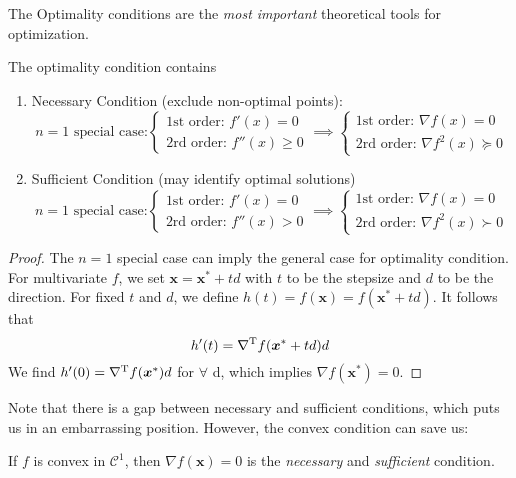 The Optimality conditions are the \emph{most important} theoretical tools for optimization.
\begin{theorem}The optimality condition contains
\begin{enumerate}
\item
Necessary Condition (exclude non-optimal points):
\[
\mbox{$n=1$ special case:}\left\{
\begin{aligned}
\mbox{1st order: }f'(x)=0\\
\mbox{2rd order: }f''(x)\ge0
\end{aligned}
\right.\implies
\left\{
\begin{aligned}
\mbox{1st order: }\nabla f(x)=0\\
\mbox{2rd order: }\nabla f^2(x)\succeq0
\end{aligned}
\right.
\]
\item
Sufficient Condition (may identify optimal solutions)
\[
\mbox{$n=1$ special case:}\left\{
\begin{aligned}
\mbox{1st order: }f'(x)=0\\
\mbox{2rd order: }f''(x)>0
\end{aligned}
\right.\implies
\left\{
\begin{aligned}
\mbox{1st order: }\nabla f(x)=0\\
\mbox{2rd order: }\nabla f^2(x)\succ0
\end{aligned}
\right.
\]
\end{enumerate}
\end{theorem}
\begin{proof}
The $n=1$ special case can imply the general case for optimality condition. For multivariate $f$, we set $\bm x=\bm x^*+td$ with $t$ to be the stepsize and $d$ to be the direction.  For fixed $t$ and $d$, we define $h(t) = f(\bm x)=f(\bm x^*+td)$. It follows that
\[
h'(t)=\nabla^{\mathrm T} f(\bm x^*+td)d
\]
We find $h'(0)=\nabla^{\mathrm T} f(\bm x^*)d$ for $\forall$ d, which implies $\nabla f(\bm x^*)=0$.
\end{proof}

Note that there is a gap between necessary and sufficient conditions, which puts us in an embarrassing position. However, the convex condition can save us:
\begin{theorem}
If $f$ is convex in $\mathcal{C}^1$, then $\nabla f(\bm x)=0$ is the \emph{necessary} and \emph{sufficient} condition.
\end{theorem}














